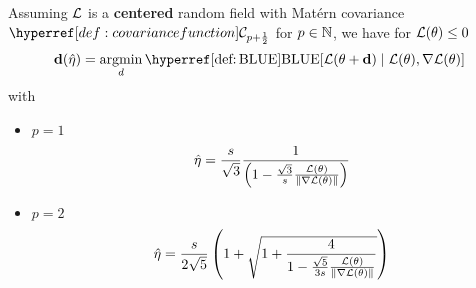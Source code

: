 \begin{theorem}
	Assuming \(\mathcal{L}\) is a \textbf{centered} random field with
	Matérn covariance \(\C_{p+\frac12}\) for \(p\in\mathbb{N}\), we have for \(\mathcal{L}(\theta)\le 0\)
	\begin{equation*}
		\step(\hat{\lr})
		= \argmin_{d}
		\BLUE[\Loss(\param + \step) \mid \Loss(\param), \grad\Loss(\param)]
	\end{equation*}
	with
	\begin{itemize}
		\item \(p=1\)
		\begin{equation*}
			\hat{\eta}
			= \frac{s}{\sqrt{3}}\frac{1}{\left(
				1- \frac{\sqrt{3}}{s}\frac{\mathcal{L}(\theta)}{\|\nabla\mathcal{L}(\theta)\|}
			\right)}
		\end{equation*}

		\item \(p=2\)
		\begin{equation*}
			\hat{\eta}
			= \frac{s}{2\sqrt5} \left(
				1 + \sqrt{1+\frac4{1-\frac{\sqrt{5}}{3s}\frac{\mathcal{L}(\theta)}{\|\nabla\mathcal{L}(\theta)\|}}}
			\right)
		\end{equation*}
	\end{itemize}
\end{theorem}
